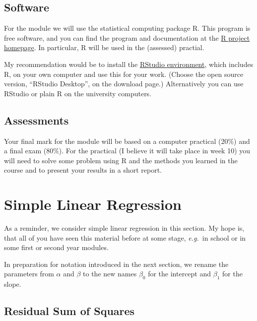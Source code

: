 \documentclass[
  a4paper,
]{article}
\theoremstyle{definition}
\theoremstyle{definition}
\theoremstyle{definition}
\theoremstyle{definition}
\theoremstyle{remark}
\begin{document}
\hypertarget{software}{%
\subsection*{Software}\label{software}}

For the module we will use the statistical computing package R. This
program is free software, and you can find the program and
documentation at the \href{https://www.r-project.org/}{R project homepage}.
In particular, R will be used in the (assessed) practial.

My recommendation would be to install the \href{https://www.rstudio.com/}{RStudio
environment}, which includes R, on your own
computer and use this for your work. (Choose the open source
version, ``RStudio Desktop'', on the download page.) Alternatively you
can use RStudio or plain R on the university computers.

\hypertarget{assessments}{%
\subsection*{Assessments}\label{assessments}}

Your final mark for the module will be based on a computer practical
(20\%) and a final exam (80\%). For the practical (I believe it will
take place in week 10) you will need to solve some problem using R and
the methods you learned in the course and to present your results in a
short report.

\clearpage

\hypertarget{S01-simple}{%
\section{Simple Linear Regression}\label{S01-simple}}

As a reminder, we consider simple linear regression in this section.
My hope is, that all of you have seen this material before at some
stage, \emph{e.g.}~in school or in some first or second year modules.

In preparation for notation introduced in the next section, we rename
the parameters from \(\alpha\) and \(\beta\) to the new names \(\beta_0\)
for the intercept and \(\beta_1\) for the slope.

\hypertarget{residual-sum-of-squares}{%
\subsection{Residual Sum of Squares}\label{residual-sum-of-squares}}
\end{document}
